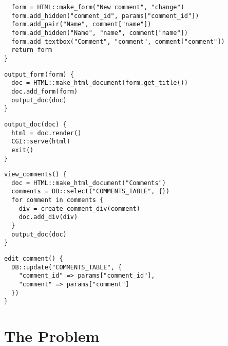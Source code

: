 \documentclass{article}
\begin{document}
\begin{multicols}{2}
{\begin{verbatim}
  form = HTML::make_form("New comment", "change")
  form.add_hidden("comment_id", params["comment_id"])
  form.add_pair("Name", comment["name"])
  form.add_hidden("Name", "name", comment["name"])
  form.add_textbox("Comment", "comment", comment["comment"])
  return form
}
\end{verbatim}

\begin{verbatim}
output_form(form) {
  doc = HTML::make_html_document(form.get_title())
  doc.add_form(form)
  output_doc(doc)
}
\end{verbatim}

\begin{verbatim}
output_doc(doc) {
  html = doc.render()
  CGI::serve(html)
  exit()
}
\end{verbatim}

\begin{verbatim}
view_comments() {
  doc = HTML::make_html_document("Comments")
  comments = DB::select("COMMENTS_TABLE", {})
  for comment in comments {
    div = create_comment_div(comment)
    doc.add_div(div)
  }
  output_doc(doc)
}
\end{verbatim}

\begin{verbatim}
edit_comment() {
  DB::update("COMMENTS_TABLE", {
    "comment_id" => params["comment_id"],
    "comment" => params["comment"]
  })
}
\end{verbatim}
}

\section{The Problem}





\end{multicols}
\end{document}

